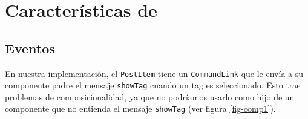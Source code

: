 
\section{Características de \PITS}





\subsection{Eventos}
\label{sub-events}

En nuestra implementación, el \verb"PostItem" tiene un \verb"CommandLink" que le envía a su componente padre el mensaje \verb"showTag" cuando un tag es seleccionado. Esto trae problemas de composicionalidad, ya que no podríamos usarlo como hijo de un componente que no entienda el mensaje \verb"showTag" (ver figura \ref{fig-comp1}).

